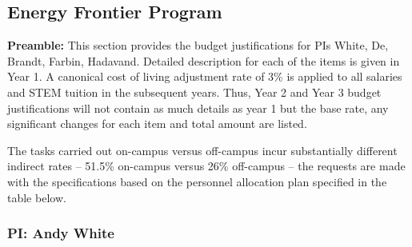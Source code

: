 \subsection{Energy Frontier Program}
{\bf Preamble:} This section provides the budget justifications for PIs White, De, Brandt, Farbin, Hadavand.  Detailed description for each of the items is given in Year 1.  A canonical cost of living adjustment rate of 3\% is applied to all salaries and STEM tuition in the subsequent years.   Thus, Year 2 and Year 3 budget justifications will not contain as much details as year 1 but the base rate, any significant changes for each item and total amount are listed.

The tasks carried out on-campus versus off-campus incur substantially different indirect rates – 51.5\% on-campus versus 26\% off-campus – the requests are made with the specifications based on the personnel allocation plan specified in the table below.  


\subsubsection{\bf PI: Andy White}

